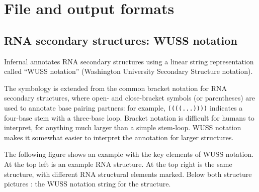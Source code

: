 \section{File and output formats}

\subsection{RNA secondary structures: WUSS notation}

Infernal annotates RNA secondary structures using a linear string
representation called ``WUSS notation'' (Washington University
Secondary Structure notation). 

The symbology is extended from the common bracket notation for RNA
secondary structures, where open- and close-bracket symbols (or
parentheses) are used to annotate base pairing partners: for example,
\verb+((((...))))+ indicates a four-base stem with a three-base loop.
Bracket notation is difficult for humans to interpret, for anything
much larger than a simple stem-loop. WUSS notation makes it somewhat
easier to interpret the annotation for larger structures.

The following figure shows an example with the key elements of WUSS
notation.  At the top left is an example RNA structure. At the top
right is the same structure, with different RNA structural elements
marked. Below both structure pictures : the WUSS notation string for
the structure.

